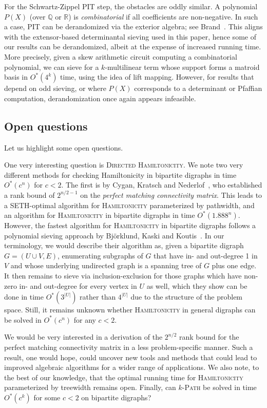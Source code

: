 \documentclass[10pt,a4paper]{article}
\newcommand{\R}{\ensuremath{\mathbb R}\xspace}
\newcommand{\Q}{\ensuremath{\mathbb Q}\xspace}
\begin{document}
For the Schwartz-Zippel PIT step, the obstacles are oddly similar. 
A polynomial $P(X)$ (over $\Q$ or $\R$) is \emph{combinatorial} if all
coefficients are non-negative. In such a case, PIT can be derandomized
via the exterior algebra; see Brand~\cite{Brand19thesis}.
This aligns with the extensor-based determinantal sieving used
in this paper, hence some of our results can be derandomized, albeit at the expense of increased running time.
More precisely, given a skew arithmetic circuit computing a combinatorial polynomial, 
we can sieve for a $k$-multilinear term whose support forms a 
matroid basis in $O^*(4^k)$ time, using the idea of lift mapping.
However, for results that depend on odd sieving, or where $P(X)$
corresponds to a determinant or Pfaffian computation, 
derandomization once again appears infeasible.

\subsection{Open questions}

Let us highlight some open questions.

One very interesting question is \textsc{Directed Hamiltonicity}.
We note two very different methods for checking Hamiltonicity
in bipartite digraphs in time $O^*(c^n)$ for $c<2$. The first is by 
Cygan, Kratsch and Nederlof~\cite{CyganKN18hamilton}, who established
a rank bound of $2^{n/2-1}$ on the \emph{perfect matching connectivity matrix}. 
This leads to a SETH-optimal algorithm for \textsc{Hamiltonicity}
parameterized by pathwidth, and an algorithm for
\textsc{Hamiltonicity} in bipartite digraphs in time $O^*(1.888^n)$.
However, the fastest algorithm for \textsc{Hamiltonicity} in bipartite
digraphs follows a polynomial sieving approach by Björklund, Kaski
and Koutis~\cite{BjorklundKK17directed}. In our terminology, we would
describe their algorithm as, given a bipartite digraph $G=(U \cup V,E)$,
enumerating subgraphs of $G$ that have in- and out-degree 1 in $V$
and whose underlying undirected graph is a spanning tree of $G$
plus one edge. It then remains to sieve via inclusion-exclusion for
those graphs which have non-zero in- and out-degree for every vertex
in $U$ as well, which they show can be done in time $O^*(3^{|U|})$ 
rather than $4^{|U|}$ due to the structure of the problem space.
Still, it remains unknown whether \textsc{Hamiltonicity} in general
digraphs can be solved in $O^*(c^n)$ for any $c<2$.

We would be very interested in a derivation of the $2^{n/2}$
rank bound for the perfect matching connectivity matrix
in a less problem-specific manner. Such a result, one would hope,
could uncover new tools and methods that could lead to improved
algebraic algorithms for a wider range of applications.
We also note, to the best of our
knowledge, that the optimal running time for \textsc{Hamiltonicity}
parameterized by treewidth remains open. Finally, can
\textsc{$k$-Path} be solved in time $O^*(c^k)$ for some $c<2$
on bipartite digraphs? 
\end{document}
